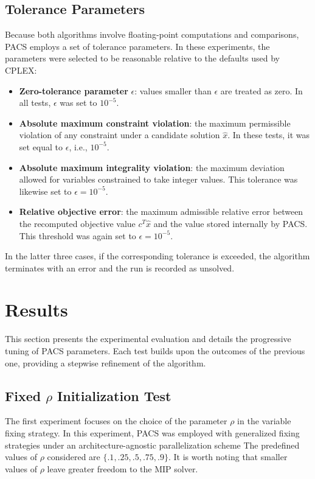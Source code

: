 \subsection{Tolerance Parameters}
Because both algorithms involve floating-point computations and comparisons, PACS employs a set of tolerance parameters. In these experiments, the parameters were selected to be reasonable relative to the defaults used by CPLEX:
\begin{itemize}
    \item \textbf{Zero-tolerance parameter} $\epsilon$: values smaller than $\epsilon$ are treated as zero. In all tests, $\epsilon$ was set to $10^{-5}$.
    \item \textbf{Absolute maximum constraint violation}: the maximum permissible violation of any constraint under a candidate solution $\hat{x}$. In these tests, it was set equal to $\epsilon$, i.e., $10^{-5}$.
    \item \textbf{Absolute maximum integrality violation}: the maximum deviation allowed for variables constrained to take integer values. This tolerance was likewise set to $\epsilon = 10^{-5}$.
    \item \textbf{Relative objective error}: the maximum admissible relative error between the recomputed objective value $c^T \hat{x}$ and the value stored internally by PACS. This threshold was again set to $\epsilon = 10^{-5}$.  
\end{itemize}  
In the latter three cases, if the corresponding tolerance is exceeded, the algorithm terminates with an error and the run is recorded as unsolved.  

\section{Results}\label{sec:result}
This section presents the experimental evaluation and details the progressive tuning of PACS parameters. Each test builds upon the outcomes of the previous one, providing a stepwise refinement of the algorithm.

\subsection{Fixed $\rho$ Initialization Test}\label{sec:test_fix_rho}
The first experiment focuses on the choice of the parameter $\rho$ in the variable fixing strategy.  
In this experiment, PACS was employed with generalized fixing strategies under an architecture-agnostic parallelization scheme
The predefined values of $\rho$ considered are $\{.1, .25, .5, .75, .9\}$.  
It is worth noting that smaller values of $\rho$ leave greater freedom to the MIP solver.  

